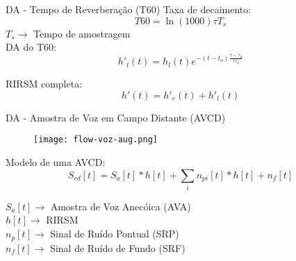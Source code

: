 \begin{frame}{DA - Tempo de Reverberação (T60)}
    Taxa de decaimento:
    \begin{equation*}
        T60 = \ln(1000) \tau T_s
    \end{equation*}
    \vspace{0.3cm}
    $T_s \rightarrow$ Tempo de amostragem \\

    \vspace{0.3cm}
    DA do T60:
    \begin{equation*}
        h'_l(t) = h_l(t) e^{-(t - t_o) \frac{\tau - \tau_d}{ \tau \tau_d} }
    \end{equation*}
    \vspace{0.3cm}
    
    RIRSM completa:
    \begin{equation*}
        h'(t) = h'_e(t) + h'_l(t)
    \end{equation*}

\end{frame}


\begin{frame}{DA - Amostra de Voz em Campo Distante (AVCD)}
    \begin{figure} 
        \texttt{[image: flow-voz-aug.png]}
        \label{fig:flow-voz-aug}
    \end{figure}
    \vspace{0.1cm}

    Modelo de uma AVCD:
    \begin{equation*} \label{eqn:AVCD-model}
        S_{cd}[t] = S_a[t] \ast h[t] + \sum_i n_{pi}[t] \ast h[t] + n_f[t]
    \end{equation*}
    \vspace{0.5cm}

    $S_a[t] \rightarrow$ Amostra de Voz Anecóica (AVA) \\
    $h[t] \rightarrow$ RIRSM \\
    $n_p[t] \rightarrow$ Sinal de Ruído Pontual (SRP) \\
    $n_f[t] \rightarrow$ Sinal de Ruído de Fundo (SRF) \\
\end{frame}

